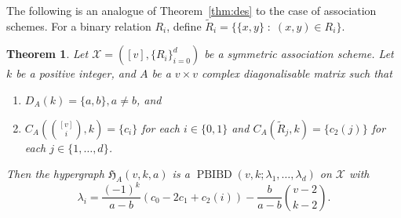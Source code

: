 \documentclass[11pt]{article}
\newtheorem{theorem}{Theorem}[section]
\begin{document}
The following is an analogue of Theorem~\ref{thm:des} to the case of association schemes. 
For a binary relation $R_i$, define  $\tilde{R}_i=\{\{x,y\}  \; : \;  (x,y)\in R_i\}$.

\begin{theorem}\label{thm:pbibd}
Let $\mathcal{X}=([v],\{R_i\}_{i=0}^d)$ be a symmetric association scheme. 
Let $k$ be a positive integer, and $A$ be a $v\times v$ complex diagonalisable matrix such that  
\begin{enumerate}
    \item $D_A(k)=\{a,b\},a\neq b$, and
    \item $C_A \left (\binom{[v]}{i},k \right) = \{c_i\}$ for each $i \in \{0,1\}$ and $C_A(\tilde{R}_j,k) = \{c_2(j)\}$ for each $j \in \{1,\dots,d\}$.
\end{enumerate}
Then the hypergraph $\mathfrak H_{A}(v,k,a)$ 
is a $\operatorname{PBIBD}(v,k;\lambda_1,\ldots,\lambda_d)$ on $\mathcal{X}$ with 
\[
\lambda_i=\frac{(-1)^k}{a-b}\left(c_0-2c_1+c_2(i)\right)-\frac{b}{a-b}\binom{v-2}{k-2}.
\]
\end{theorem}
\end{document}
